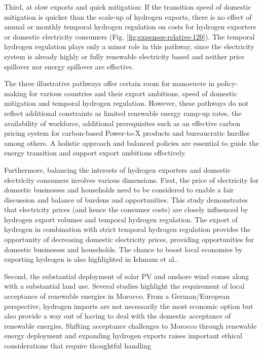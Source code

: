 Third, at slow exports and quick \co mitigation: If the transition speed of domestic \co mitigation is quicker than the scale-up of hydrogen exports, there is no effect of annual or monthly temporal hydrogen regulation on costs for hydrogen exporters or domestic electricity consumers (Fig. \ref{fig:expenses-relative-120}). The temporal hydrogen regulation plays only a minor role in this pathway, since the electricity system is already highly or fully renewable electricity based and neither price spillover nor energy spillover are effective.

The three illustrative pathways offer certain room for manoeuvre in policy-making for various countries and their export ambitions, speed of domestic \co mitigation and temporal hydrogen regulation. However, these pathways do not reflect additional constraints as limited renewable energy ramp-up rates, the availability of workforce, additional prerequisites such as an effective carbon pricing system for carbon-based Power-to-X products and bureaucratic hurdles among others. 
A holistic approach and balanced policies are essential to guide the energy transition and support export ambitions effectively.


Furthermore, balancing the interests of hydrogen exporters and domestic electricity consumers involves various dimensions.
First, the price of electricity for domestic businesses and households need to be considered to enable a fair discussion and balance of burdens and opportunities. 
This study demonstrates that electricity prices (and hence the consumer costs) are closely influenced by hydrogen export volumes and temporal hydrogen regulation. 
The export of hydrogen in combination with strict temporal hydrogen regulation provides the opportunity of decreasing domestic electricity prices, providing opportunities for domestic businesses and households. The chance to boost local economies by exporting hydrogen is also highlighted in Ishmam et al.\cite{Ishmam2024}.

Second, the substantial deployment of solar PV and onshore wind comes along with a substantial land use. Several studies \cite{Terrapon-Pfaff2019, Hanger2016} highlight the requirement of local acceptance of renewable energies in Morocco. From a German/European perspective, hydrogen imports are not necessarily the most economic option \cite{Merten2023} but also provide a way out of having to deal with the domestic acceptance of renewable energies.
Shifting acceptance challenges to Morocco through renewable energy deployment and expanding hydrogen exports raises important ethical considerations that require thoughtful handling

